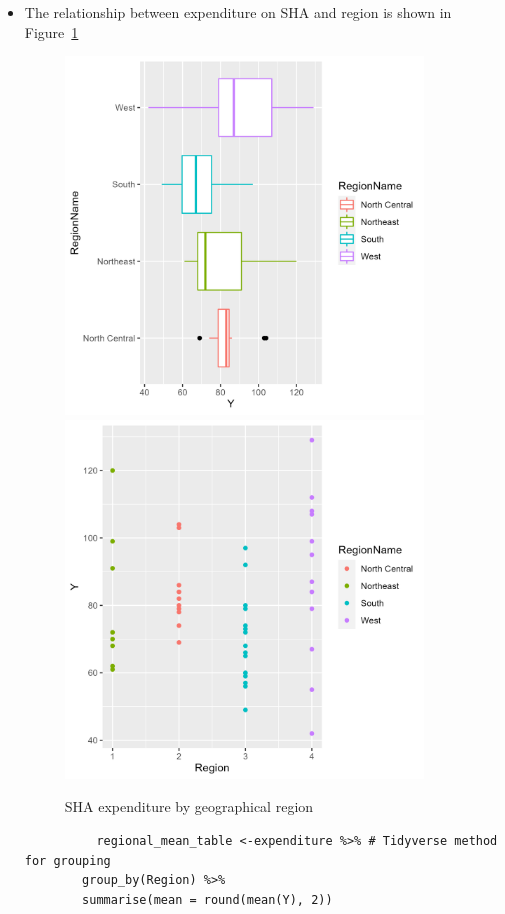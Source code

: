 \documentclass[12pt,letterpaper]{article}
\begin{document}
\begin{itemize}
		
		\vspace{.5cm}
		\item
		\clearpage
		The relationship between expenditure on SHA and region is shown in Figure~\ref{regions}

    \begin{figure}
      \includegraphics[width=9.5cm]{region_boxplot.png}
    	\includegraphics[width=9.5cm]{region_y.png}
      \caption{SHA expenditure by geographical region}\label{regions}
    \end{figure}
    
		\begin{verbatim}
		  regional_mean_table <-expenditure %>% # Tidyverse method for grouping
        group_by(Region) %>%
        summarise(mean = round(mean(Y), 2))
		\end{verbatim}
    

\end{itemize}
\end{document}
